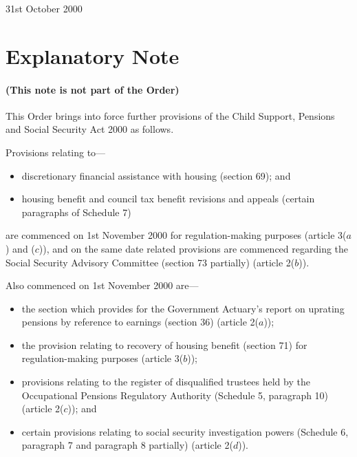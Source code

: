 \documentclass[12pt,a4paper]{article}
\begin{document}
31st October 2000

\small

\part{Explanatory Note}

\renewcommand\parthead{--- Explanatory Note}

\subsection*{(This note is not part of the Order)}

This Order brings into force further provisions of the Child Support, Pensions and Social Security Act 2000 as follows.

Provisions relating to—
\begin{itemize}
\item    discretionary financial assistance with housing (section 69); and

\item    housing benefit and council tax benefit revisions and appeals (certain paragraphs of Schedule 7) 
\end{itemize}
are commenced on 1st November 2000 for regulation-making purposes (article 3($a$)  and ($c$)), and on the same date related provisions are commenced regarding the Social Security Advisory Committee (section 73 partially) (article 2($b$)).

Also commenced on 1st November 2000 are—
\begin{itemize}
\item    the section which provides for the Government Actuary’s report on uprating pensions by reference to earnings (section 36) (article 2($a$));

\item    the provision relating to recovery of housing benefit (section 71) for regulation\hspace{0pt}-making purposes (article 3($b$));

\item    provisions relating to the register of disqualified trustees held by the Occupational Pensions Regulatory Authority (Schedule 5, paragraph 10) (article 2($c$)); and

\item    certain provisions relating to social security investigation powers (Schedule 6, paragraph 7 and paragraph 8 partially) (article 2($d$)). 
\end{itemize}
\end{document}
